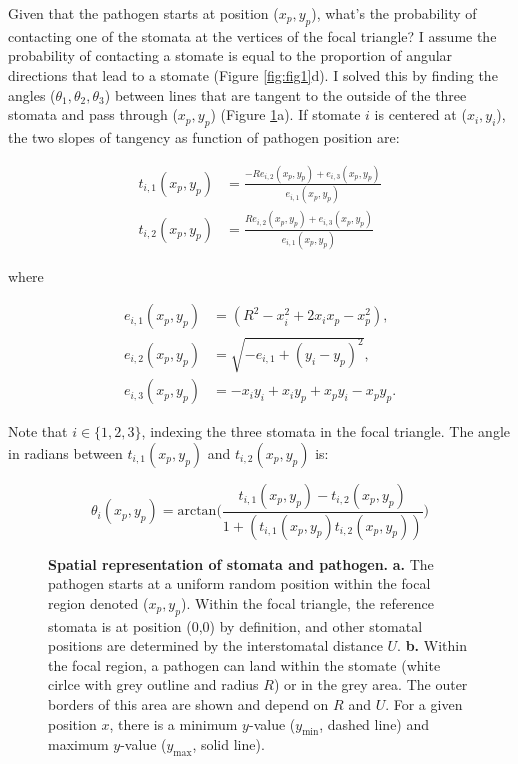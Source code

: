 \documentclass[utf8]{frontiersSCNS}
\begin{document}
Given that the pathogen starts at position (\(x_p,y_p\)), what's the
probability of contacting one of the stomata at the vertices of the
focal triangle? I assume the probability of contacting a stomate is
equal to the proportion of angular directions that lead to a stomate
(Figure \ref{fig:fig1}d). I solved this by finding the angles
(\(\theta_1, \theta_2, \theta_3\)) between lines that are tangent to the
outside of the three stomata and pass through (\(x_p,y_p\)) (Figure
\ref{fig:fig2}a). If stomate \(i\) is centered at (\(x_i,y_i\)), the two
slopes of tangency as function of pathogen position are:

\begin{align}
  t_{i,1}(x_p,y_p) & = \frac{-R e_{i,2}(x_p,y_p) + e_{i,3}(x_p,y_p)}{e_{i,1}(x_p,y_p)} \\
  t_{i,2}(x_p,y_p) & = \frac{R e_{i,2}(x_p,y_p) + e_{i,3}(x_p,y_p)}{e_{i,1}(x_p,y_p)}
\end{align}

where

\begin{align}
  e_{i,1}(x_p,y_p) & = (R^2 - x_i^2 + 2 x_i x_p - x_p^2), \\
  e_{i,2}(x_p,y_p) & = \sqrt{-e_{i,1} + (y_i - y_p) ^ 2}, \\
  e_{i,3}(x_p,y_p) & = - x_i y_i + x_i y_p + x_p y_i - x_p y_p.
\end{align}

Note that \(i \in \{1, 2, 3\}\), indexing the three stomata in the focal
triangle. The angle in radians between \(t_{i,1}(x_p,y_p)\) and
\(t_{i,2}(x_p,y_p)\) is:

\begin{equation}
  \theta_i(x_p,y_p) = \text{arctan}\bigg(\frac{t_{i,1}(x_p,y_p) - t_{i,2}(x_p,y_p)}{1 + (t_{i,1}(x_p,y_p) t_{i,2}(x_p,y_p))}\bigg)
\end{equation}

\begin{figure}
\centering

\caption{\textbf{Spatial representation of stomata and pathogen.} \textbf{a.} The pathogen starts at a uniform random position within the focal region denoted ($x_p,y_p$). Within the focal triangle, the reference stomata is at position (0,0) by definition, and other stomatal positions are determined by the interstomatal distance $U$. \textbf{b.} Within the focal region, a pathogen can land within the stomate (white cirlce with grey outline and radius $R$) or in the grey area. The outer borders of this area are shown and depend on $R$ and $U$. For a given position $x$, there is a minimum $y$-value ($y_\text{min}$, dashed line) and maximum $y$-value ($y_\text{max}$, solid line).}
\label{fig:fig2}
\end{figure}
\end{document}
